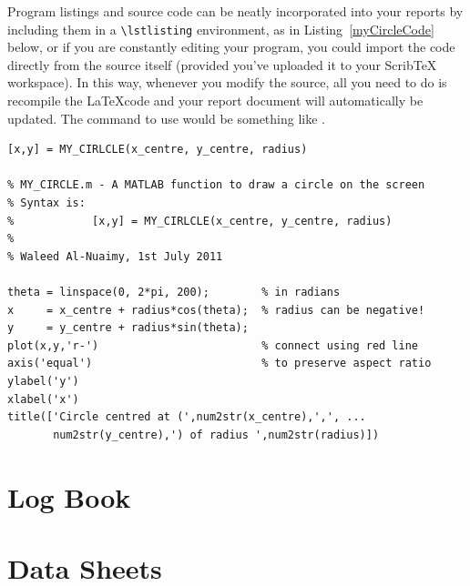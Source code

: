 \documentclass[11pt, a4paper]{article}
\begin{document}
Program listings and source code can be neatly incorporated into your reports by including them in a \verb|\lstlisting| environment, as in Listing~\ref{myCircleCode} below, or if you are constantly editing your program, you could import the code directly from the source itself (provided you've uploaded it to your ScribTeX workspace). In this way, whenever you modify the source, all you need to do is recompile the \LaTeX code and your report document will automatically be updated. The command to use would be something like \verb||.

\begin{lstlisting}
[x,y] = MY_CIRLCLE(x_centre, y_centre, radius)

% MY_CIRCLE.m - A MATLAB function to draw a circle on the screen
% Syntax is:
%            [x,y] = MY_CIRLCLE(x_centre, y_centre, radius)
%
% Waleed Al-Nuaimy, 1st July 2011

theta = linspace(0, 2*pi, 200);        % in radians
x     = x_centre + radius*cos(theta);  % radius can be negative!
y     = y_centre + radius*sin(theta);
plot(x,y,'r-')                         % connect using red line
axis('equal')                          % to preserve aspect ratio
ylabel('y')
xlabel('x')
title(['Circle centred at (',num2str(x_centre),',', ...
       num2str(y_centre),') of radius ',num2str(radius)])
\end{lstlisting}


\section{Log Book}


\section{Data Sheets}
\end{document}
